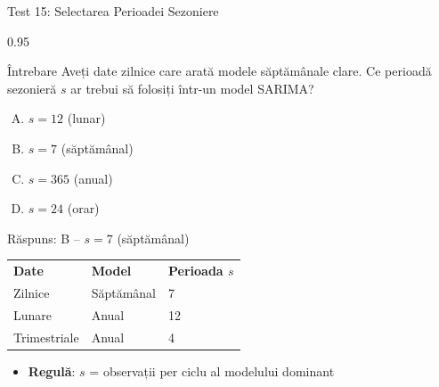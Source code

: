 \documentclass[9pt, aspectratio=169, t]{beamer}
\begin{document}
\begin{frame}{Test 15: Selectarea Perioadei Sezoniere}
    \begin{cminipage}{0.95\textwidth}
    \begin{alertblock}{Întrebare}
        Aveți date zilnice care arată modele săptămânale clare. Ce perioadă sezonieră $s$ ar trebui să folosiți într-un model SARIMA?
    \end{alertblock}

    \vspace{0.15cm}

    \begin{enumerate}[A)]\setlength{\itemsep}{0pt}
        \item $s = 12$ (lunar)
        \item $s = 7$ (săptămânal)
        \item $s = 365$ (anual)
        \item $s = 24$ (orar)
    \end{enumerate}

    \vspace{0.15cm}
    \pause
    \begin{exampleblock}{Răspuns: B -- $s = 7$ (săptămânal)}
        {\footnotesize
        \begin{center}
        \begin{tabular}{lll}
            \textbf{Date} & \textbf{Model} & \textbf{Perioada $s$} \\
            Zilnice & Săptămânal & 7 \\
            Lunare & Anual & 12 \\
            Trimestriale & Anual & 4
        \end{tabular}
        \end{center}
        \vspace{-2mm}
        \begin{itemize}\setlength{\itemsep}{0pt}
        \item \textbf{Regulă}: $s$ = observații per ciclu al modelului dominant
        \end{itemize}
        }
    \end{exampleblock}
    \end{cminipage}
\end{frame}
\end{document}

